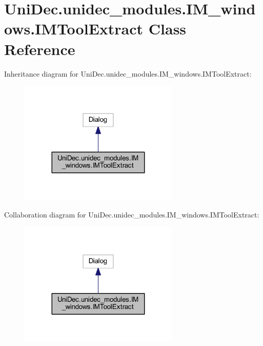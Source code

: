 \hypertarget{class_uni_dec_1_1unidec__modules_1_1_i_m__windows_1_1_i_m_tool_extract}{}\section{Uni\+Dec.\+unidec\+\_\+modules.\+I\+M\+\_\+windows.\+I\+M\+Tool\+Extract Class Reference}
\label{class_uni_dec_1_1unidec__modules_1_1_i_m__windows_1_1_i_m_tool_extract}


Inheritance diagram for Uni\+Dec.\+unidec\+\_\+modules.\+I\+M\+\_\+windows.\+I\+M\+Tool\+Extract\+:\nopagebreak
\begin{figure}[H]
\begin{center}
\leavevmode
\includegraphics[width=215pt]{class_uni_dec_1_1unidec__modules_1_1_i_m__windows_1_1_i_m_tool_extract__inherit__graph}
\end{center}
\end{figure}


Collaboration diagram for Uni\+Dec.\+unidec\+\_\+modules.\+I\+M\+\_\+windows.\+I\+M\+Tool\+Extract\+:\nopagebreak
\begin{figure}[H]
\begin{center}
\leavevmode
\includegraphics[width=215pt]{class_uni_dec_1_1unidec__modules_1_1_i_m__windows_1_1_i_m_tool_extract__coll__graph}
\end{center}
\end{figure}
